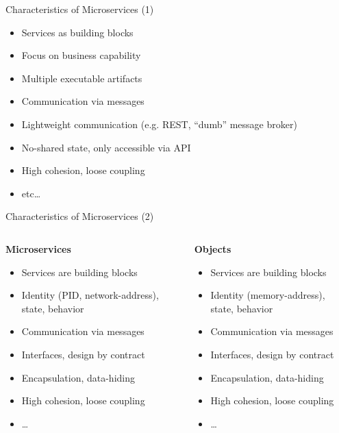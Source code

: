 \documentclass{beamer}
\begin{document}
\begin{frame}{Characteristics of Microservices (1)}

  \begin{itemize}
    \item Services as building blocks
    \item Focus on business capability
    \item Multiple executable artifacts
    \item Communication via messages
    \item Lightweight communication (e.g. REST, “dumb” message broker)
    \item No-shared state, only accessible via API
    \item High cohesion, loose coupling
    \item etc…
  \end{itemize}

\end{frame}

\begin{frame}{Characteristics of Microservices (2)}
    \begin{columns}[T] %
    \begin{column}[T]{5.5cm} %
    	\textbf{Microservices}
    	\begin{itemize}
        \item Services are building blocks
        \item Identity (PID, network-address), state, behavior
        \item Communication via messages
        \item Interfaces, design by contract
        \item Encapsulation, data-hiding
        \item High cohesion, loose coupling
        \item …
      	\end{itemize}
    \end{column}
    \pause
    \begin{column}[T]{5.5cm} %
		\textbf{Objects}
    	\begin{itemize}
        \item Services are building blocks
        \item Identity (memory-address), state, behavior
        \item Communication via messages
        \item Interfaces, design by contract
        \item Encapsulation, data-hiding
        \item High cohesion, loose coupling
        \item …
      	\end{itemize}
    \end{column}
    \end{columns}
\end{frame}
\end{document}

